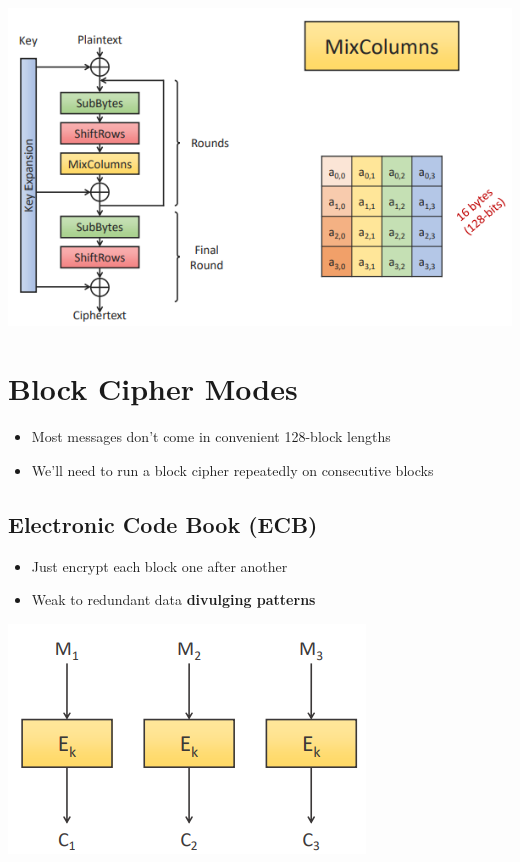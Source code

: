 \documentclass{article}
\begin{document}
\begin{center}
  \includegraphics[scale=0.5]{aes.png}
\end{center}

\section{Block Cipher Modes}
\begin{itemize}
  \item Most messages don’t come in convenient 128-block lengths 
  \item We’ll need to run a block cipher repeatedly on consecutive blocks
\end{itemize}

\subsection{Electronic Code Book (ECB)}
\begin{itemize}
  \item Just encrypt each block one after another 
  \item Weak to redundant data \textbf{divulging patterns}
\end{itemize}
\begin{center}
  \includegraphics[scale=0.5]{ecb.png}
\end{center}
\end{document}
